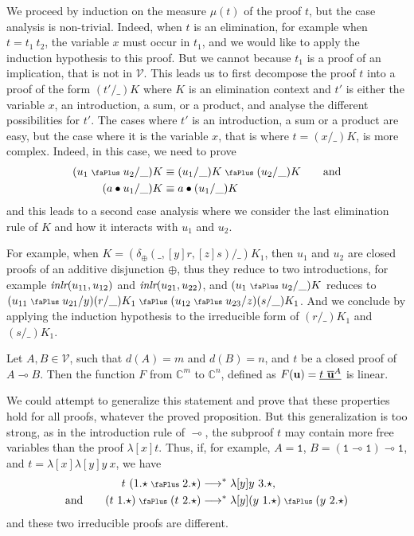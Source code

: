 \documentclass[screen, sigconf,authorversion,nonacm]{acmart}
\theoremstyle{acmdefinition}
\numberwithin{equation}{section}
\newcommand\abstr[1]{[#1]}
\newcommand\inlr{\mbox{\it inlr}}
\newcommand\plus{\mathrel{\text{\normalfont\scalebox{0.7}{\faPlus}}}}
\newcommand\lra{\longrightarrow}
\newcommand\one{\ensuremath{\mathtt 1}}
\newcommand\elimplus{\delta_{\oplus}}
\begin{document}
We proceed by induction on the measure $\mu(t)$ of the proof $t$, but
the case analysis is non-trivial. Indeed, when $t$ is an elimination,
for example when $t = t_1~t_2$, the variable $x$ must occur in $t_1$,
and we would like to apply the induction hypothesis to this proof.
But we cannot because $t_1$ is a proof of an implication, that is not
in $\mathcal{V}$.  This leads us to first decompose the proof $t$ into
a proof of the form $(t'/\_)K$ where $K$ is an elimination context and
$t'$ is either the variable $x$, an introduction, a sum, or a product,
and analyse the different possibilities for $t'$. The cases where $t'$
is an introduction, a sum or a product are easy, but the case where it
is the variable $x$, that is where $t = (x/\_)K$, is more complex.
Indeed, in this case, we need to prove
\begin{align*}
(u_1 \plus u_2/\_)K &\equiv (u_1/\_)K \plus (u_2/\_)K\qquad\textrm{and}\\ 
(a \bullet u_1/\_)K &\equiv a \bullet (u_1/\_)K
\end{align*}
and this leads to a second case analysis where we consider the last elimination
rule of $K$ and how it interacts with $u_1$ and $u_2$.

For example, when $K = (\elimplus(\_,\abstr{y}r,\abstr{z}s)/\_)K_1$,
then $u_1$ and $u_2$ are closed proofs of an additive disjunction
$\oplus$, thus they reduce to two introductions, for example
$\inlr(u_{11},u_{12})$ and $\inlr(u_{21},u_{22})$, and $(u_1 \plus
u_2/\_) K$ reduces to $(u_{11} \plus u_{21}/y)(r/\_)K_1 \plus (u_{12}
\plus u_{23}/z)(s/\_)K_1$.  And we conclude by applying the induction
hypothesis to the irreducible form of $(r/\_)K_1$ and $(s/\_)K_1$.


\begin{theorem}\label{thm:converse}
  Let $A, B \in {\mathcal V}$, such that $d(A) = m$ and $d(B) = n$, 
  and  $t$ be a closed proof of $A \multimap B$.
  Then the function $F$ from ${\mathbb C}^m$ to ${\mathbb C}^n$,
  defined as
  $F({\bf u}) = \underline{t~\overline{\bf u}^A}$ is linear.
\end{theorem}

We could attempt to generalize this statement and prove that these
properties hold for all proofs, whatever the proved proposition. But
this generalization is too strong, as in the introduction rule of
$\multimap$, the subproof $t$ may contain more free variables than the
proof $\lambda \abstr{x} t$.  Thus, if, for example, $A = \one$, $B =
(\one \multimap \one) \multimap \one$, and $t = \lambda \abstr{x}
\lambda \abstr{y}y~x$, we have
\begin{align*}
t~({1.\star} \plus 2.\star) &\lra^* \lambda \abstr{y} y~3.{\star},\\
\textrm{and}\qquad(t~1.\star) \plus (t~2.\star) &\lra^*
\lambda \abstr{y} {(y~1.\star)} \plus {(y~2.\star)}
\end{align*}
and these two irreducible proofs are different.
\end{document}
